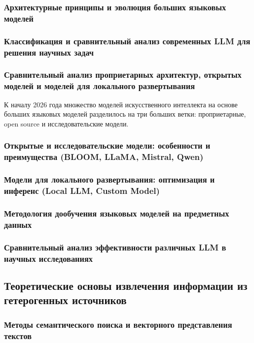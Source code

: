 \documentclass{syksu-coursework}
\begin{document}
\subsubsection{Архитектурные принципы и эволюция больших языковых моделей}

\subsubsection{Классификация и сравнительный анализ современных LLM для решения научных задач}

\subsubsection{Сравнительный анализ проприетарных архитектур, открытых моделей и моделей для локального развертывания}

К началу 2026 года множество моделей искусственного интеллекта на основе больших языковых моделей разделилось на три больших ветки: проприетарные, open source и исследовательские модели.

\subsubsection{Открытые и исследовательские модели: особенности и преимущества (BLOOM, LLaMA, Mistral, Qwen)}

\subsubsection{Модели для локального развертывания: оптимизация и инференс (Local LLM, Custom Model)}

\subsubsection{Методология дообучения языковых моделей на предметных данных}

\subsubsection{Сравнительный анализ эффективности различных LLM в научных исследованиях}

\subsection{Теоретические основы извлечения информации из гетерогенных источников}

\subsubsection{Методы семантического поиска и векторного представления текстов}
\end{document}
